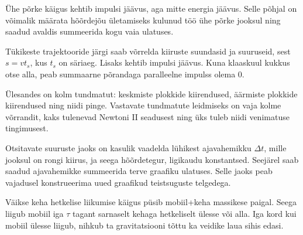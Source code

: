 \documentclass[10pt, twoside]{article}
\begin{document}
{%

\hint
Ühe põrke käigus kehtib impulsi jäävus, aga mitte energia jäävus. Selle põhjal on võimalik määrata hõõrdejõu ületamiseks kulunud töö ühe põrke jooksul ning saadud avaldis summeerida kogu vaia ulatuses.
\probend
\bigskip


\hint
Tükikeste trajektooride järgi saab võrrelda kiiruste suundasid ja suuruseid, sest $s = vt_s$, kus $t_s$ on säriaeg. Lisaks kehtib impulsi jäävus. Kuna klaaskuul kukkus otse alla, peab summaarne põrandaga paralleelne impulss olema 0.
\probend
\bigskip


\hint
Ülesandes on kolm tundmatut: keskmiste plokkide kiirendused, äärmiste plokkide kiirendused ning niidi pinge. Vastavate tundmatute leidmiseks on vaja kolme võrrandit, kaks tulenevad Newtoni II seadusest ning üks tuleb niidi venimatuse tingimusest.
\probend
\bigskip


\hint
Otsitavate suuruste jaoks on kasulik vaadelda lühikest ajavahemikku $\Delta t$, mille jooksul on rongi kiirus, ja seega hõõrdetegur, ligikaudu konstantsed. Seejärel saab saadud ajavahemikke summeerida terve graafiku ulatuses. Selle jaoks peab vajadusel konstrueerima uued graafikud teistsuguste telgedega.
\probend
\bigskip


\hint
Väikse keha hetkelise liikumise käigus püsib mobiil+keha massikese paigal. Seega liigub mobiil iga $\tau$ tagant sarnaselt kehaga hetkeliselt ülesse või alla. Iga kord kui mobiil ülesse liigub, nihkub ta gravitatsiooni tõttu ka veidike laua sihis edasi.
\probend
\bigskip


}
\end{document}

